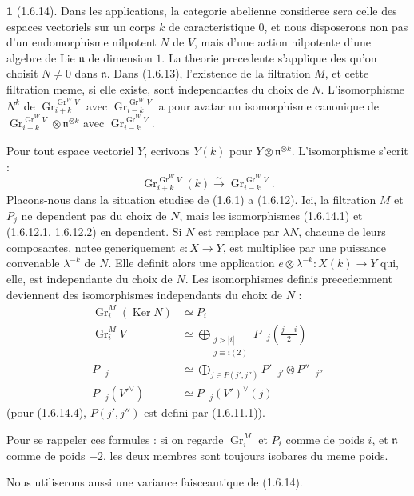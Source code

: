 \documentclass[12pt,a4paper]{article}
\theoremstyle{plain}
\theoremstyle{definition}
\theoremstyle{definition}
\newtheorem{para}{}[section]
\theoremstyle{remark}
\DeclareMathOperator{\Gr}{Gr}
\DeclareMathOperator{\Ker}{Ker}
\begin{document}
\begin{para}[1.6.14]
Dans les applications, la categorie abelienne consideree sera celle des espaces vectoriels sur un corps $k$ de caracteristique $0$, et nous disposerons non pas d'un endomorphisme nilpotent $N$ de $V$, mais d'une action nilpotente d'une algebre de Lie $\mathfrak{n}$ de dimension $1$. La theorie precedente s'applique des qu'on choisit $N \neq 0$ dans $\mathfrak{n}$. Dans (1.6.13), l'existence de la filtration $M$, et cette filtration meme, si elle existe, sont independantes du choix de $N$. L'isomorphisme $N^k$ de $\Gr_{i+k}^{\Gr^W V}$ avec $\Gr_{i-k}^{\Gr^W V}$ a pour avatar un isomorphisme canonique de $\Gr_{i+k}^{\Gr^W V} \otimes \mathfrak{n}^{\otimes k}$ avec $\Gr_{i-k}^{\Gr^W V}$.

Pour tout espace vectoriel $Y$, ecrivons $Y(k)$ pour $Y \otimes \mathfrak{n}^{\otimes k}$. L'isomorphisme s'ecrit :
\begin{equation}\tag{1.6.14.1}
\Gr_{i+k}^{\Gr^W V}(k) \xrightarrow{\sim} \Gr_{i-k}^{\Gr^W V}.
\end{equation}
Placons-nous dans la situation etudiee de (1.6.1) a (1.6.12). Ici, la filtration $M$ et $P_j$ ne dependent pas du choix de $N$, mais les isomorphismes (1.6.14.1) et (1.6.12.1, 1.6.12.2) en dependent. Si $N$ est remplace par $\lambda N$, chacune de leurs composantes, notee generiquement $e: X \to Y$, est multipliee par une puissance convenable $\lambda^{-k}$ de $N$. Elle definit alors une application $e \otimes \lambda^{-k}: X(k) \to Y$ qui, elle, est independante du choix de $N$. Les isomorphismes definis precedemment deviennent des isomorphismes independants du choix de $N$ :
\begin{align}
\Gr_i^M(\Ker N) &\simeq P_i \tag{1.6.14.2}\\
\Gr_i^M V &\simeq \bigoplus_{\substack{j > |i| \\ j \equiv i (2)}} P_{-j}(\tfrac{j-i}{2}) \tag{1.6.14.3}\\
P_{-j} &\simeq \bigoplus_{j \in P(j',j'')} P'_{-j'} \otimes P''_{-j''} \tag{1.6.14.4}\\
P_{-j}(V'^\vee) &\simeq P_{-j}(V')^\vee(j) \tag{1.6.14.5}
\end{align}
(pour (1.6.14.4), $P(j',j'')$ est defini par (1.6.11.1)).

Pour se rappeler ces formules : si on regarde $\Gr_i^M$ et $P_i$ comme de poids $i$, et $\mathfrak{n}$ comme de poids $-2$, les deux membres sont toujours isobares du meme poids.

Nous utiliserons aussi une variance faisceautique de (1.6.14).
\end{para}
\end{document}
